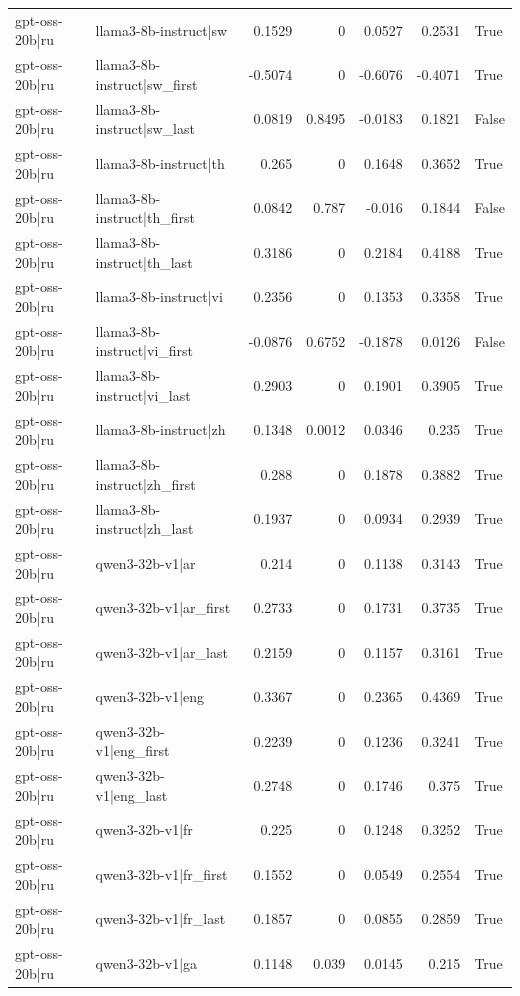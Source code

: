 \begin{table}
\begin{tabular}{l l r r r r l}
gpt-oss-20b|ru & llama3-8b-instruct|sw & 0.1529 & 0 & 0.0527 & 0.2531 & True \\
gpt-oss-20b|ru & llama3-8b-instruct|sw_first & -0.5074 & 0 & -0.6076 & -0.4071 & True \\
gpt-oss-20b|ru & llama3-8b-instruct|sw_last & 0.0819 & 0.8495 & -0.0183 & 0.1821 & False \\
gpt-oss-20b|ru & llama3-8b-instruct|th & 0.265 & 0 & 0.1648 & 0.3652 & True \\
gpt-oss-20b|ru & llama3-8b-instruct|th_first & 0.0842 & 0.787 & -0.016 & 0.1844 & False \\
gpt-oss-20b|ru & llama3-8b-instruct|th_last & 0.3186 & 0 & 0.2184 & 0.4188 & True \\
gpt-oss-20b|ru & llama3-8b-instruct|vi & 0.2356 & 0 & 0.1353 & 0.3358 & True \\
gpt-oss-20b|ru & llama3-8b-instruct|vi_first & -0.0876 & 0.6752 & -0.1878 & 0.0126 & False \\
gpt-oss-20b|ru & llama3-8b-instruct|vi_last & 0.2903 & 0 & 0.1901 & 0.3905 & True \\
gpt-oss-20b|ru & llama3-8b-instruct|zh & 0.1348 & 0.0012 & 0.0346 & 0.235 & True \\
gpt-oss-20b|ru & llama3-8b-instruct|zh_first & 0.288 & 0 & 0.1878 & 0.3882 & True \\
gpt-oss-20b|ru & llama3-8b-instruct|zh_last & 0.1937 & 0 & 0.0934 & 0.2939 & True \\
gpt-oss-20b|ru & qwen3-32b-v1|ar & 0.214 & 0 & 0.1138 & 0.3143 & True \\
gpt-oss-20b|ru & qwen3-32b-v1|ar_first & 0.2733 & 0 & 0.1731 & 0.3735 & True \\
gpt-oss-20b|ru & qwen3-32b-v1|ar_last & 0.2159 & 0 & 0.1157 & 0.3161 & True \\
gpt-oss-20b|ru & qwen3-32b-v1|eng & 0.3367 & 0 & 0.2365 & 0.4369 & True \\
gpt-oss-20b|ru & qwen3-32b-v1|eng_first & 0.2239 & 0 & 0.1236 & 0.3241 & True \\
gpt-oss-20b|ru & qwen3-32b-v1|eng_last & 0.2748 & 0 & 0.1746 & 0.375 & True \\
gpt-oss-20b|ru & qwen3-32b-v1|fr & 0.225 & 0 & 0.1248 & 0.3252 & True \\
gpt-oss-20b|ru & qwen3-32b-v1|fr_first & 0.1552 & 0 & 0.0549 & 0.2554 & True \\
gpt-oss-20b|ru & qwen3-32b-v1|fr_last & 0.1857 & 0 & 0.0855 & 0.2859 & True \\
gpt-oss-20b|ru & qwen3-32b-v1|ga & 0.1148 & 0.039 & 0.0145 & 0.215 & True \\

\end{tabular}
\end{table}
